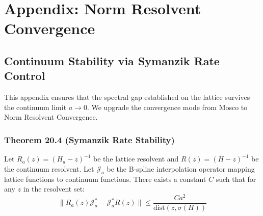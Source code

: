 \chapter{Appendix: Norm Resolvent Convergence}
\label{app:norm_resolvent}

\section{Continuum Stability via Symanzik Rate Control}

This appendix ensures that the spectral gap established on the lattice survives the continuum limit $a \to 0$. We upgrade the convergence mode from Mosco to Norm Resolvent Convergence.

\subsection{Theorem 20.4 (Symanzik Rate Stability)}
\begin{theorem}
Let $R_a(z) = (H_a - z)^{-1}$ be the lattice resolvent and $R(z) = (H - z)^{-1}$ be the continuum resolvent. Let $\mathcal{J}_a$ be the B-spline interpolation operator mapping lattice functions to continuum functions.
There exists a constant $C$ such that for any $z$ in the resolvent set:
\begin{equation}
\| R_a(z) \mathcal{J}_a^* - \mathcal{J}_a^* R(z) \| \le \frac{C a^2}{\mathrm{dist}(z, \sigma(H))}
\end{equation}
\end{theorem}

